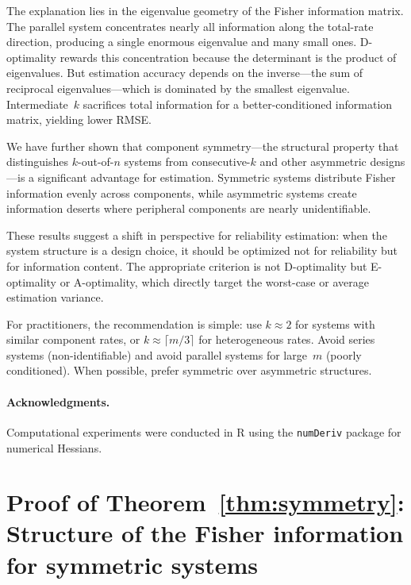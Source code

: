 \documentclass[12pt]{article}
\theoremstyle{definition}
\theoremstyle{remark}
\begin{document}
The explanation lies in the eigenvalue geometry of the Fisher
information matrix.  The parallel system concentrates nearly all
information along the total-rate direction, producing a single
enormous eigenvalue and many small ones.  D-optimality rewards this
concentration because the determinant is the product of eigenvalues.
But estimation accuracy depends on the inverse---the sum of reciprocal
eigenvalues---which is dominated by the smallest eigenvalue.
Intermediate~$k$ sacrifices total information for a better-conditioned
information matrix, yielding lower RMSE.

We have further shown that component symmetry---the structural
property that distinguishes $k$-out-of-$n$ systems from consecutive-$k$
and other asymmetric designs---is a significant advantage for
estimation.  Symmetric systems distribute Fisher information evenly
across components, while asymmetric systems create information deserts
where peripheral components are nearly unidentifiable.

These results suggest a shift in perspective for reliability
estimation: when the system structure is a design choice, it should be
optimized not for reliability but for information content.  The
appropriate criterion is not D-optimality but E-optimality or
A-optimality, which directly target the worst-case or average
estimation variance.

For practitioners, the recommendation is simple: use
$k \approx 2$ for systems with similar component rates, or
$k \approx \lceil m/3 \rceil$ for heterogeneous rates.  Avoid series
systems (non-identifiable) and avoid parallel systems for large~$m$
(poorly conditioned).  When possible, prefer symmetric over asymmetric
structures.

\paragraph{Acknowledgments.}
Computational experiments were conducted in R \citep{RCore2024} using
the \texttt{numDeriv} package \citep{numDeriv} for numerical
Hessians.




\appendix

\section{Proof of Theorem~\ref{thm:symmetry}: Structure of the Fisher information for symmetric systems}
\label{app:symproof}
\end{document}
